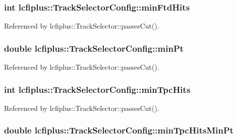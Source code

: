 \subsubsection[{min\-Ftd\-Hits}]{\setlength{\rightskip}{0pt plus 5cm}int lcfiplus\-::\-Track\-Selector\-Config\-::min\-Ftd\-Hits}\label{classlcfiplus_1_1TrackSelectorConfig_a5b50cb754fd48c457e4cb2b153f9aad4}


Referenced by lcfiplus\-::\-Track\-Selector\-::passes\-Cut().

\subsubsection[{min\-Pt}]{\setlength{\rightskip}{0pt plus 5cm}double lcfiplus\-::\-Track\-Selector\-Config\-::min\-Pt}\label{classlcfiplus_1_1TrackSelectorConfig_a3d2e4772eecd6700b09870860bc1d022}


Referenced by lcfiplus\-::\-Track\-Selector\-::passes\-Cut().

\subsubsection[{min\-Tpc\-Hits}]{\setlength{\rightskip}{0pt plus 5cm}int lcfiplus\-::\-Track\-Selector\-Config\-::min\-Tpc\-Hits}\label{classlcfiplus_1_1TrackSelectorConfig_adb1036f688d4c1db6995c01ad3fdfcc3}


Referenced by lcfiplus\-::\-Track\-Selector\-::passes\-Cut().

\subsubsection[{min\-Tpc\-Hits\-Min\-Pt}]{\setlength{\rightskip}{0pt plus 5cm}double lcfiplus\-::\-Track\-Selector\-Config\-::min\-Tpc\-Hits\-Min\-Pt}\label{classlcfiplus_1_1TrackSelectorConfig_adbe9bd4a630334d73ee09805aada39e3}


